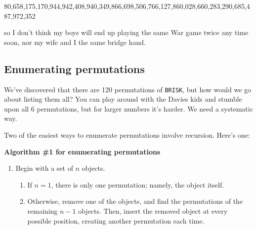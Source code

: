 {\tiny
\begin{center}
80,658,175,170,944,942,408,940,349,866,698,506,766,127,860,028,660,283,290,685,487,972,352
\end{center}
}
so I don't think my boys will end up playing the same War game twice any
time soon, nor my wife and I the same bridge hand.


\subsection{Enumerating permutations}

We've discovered that there are 120 permutations of \texttt{BRISK}, but how
would we go about listing them all? You can play around with the Davies
kids and stumble upon all 6 permutations, but for larger numbers it's 
harder. We need a systematic way.

Two of the easiest ways to enumerate permutations involve recursion. Here's
one:

\begin{nobreak}
\textbf{Algorithm \#1 for enumerating permutations}
\begin{enumerate}
\item Begin with a set of $n$ objects.
    \begin{enumerate}
    \item If $n=1$, there is only one permutation; namely, the object itself.
    \item Otherwise, remove one of the objects, and find the
    permutations of the remaining $n-1$ objects. Then, insert the removed
    object at every possible position, creating another permutation each time.
    \end{enumerate}
\end{enumerate}
\end{nobreak}

